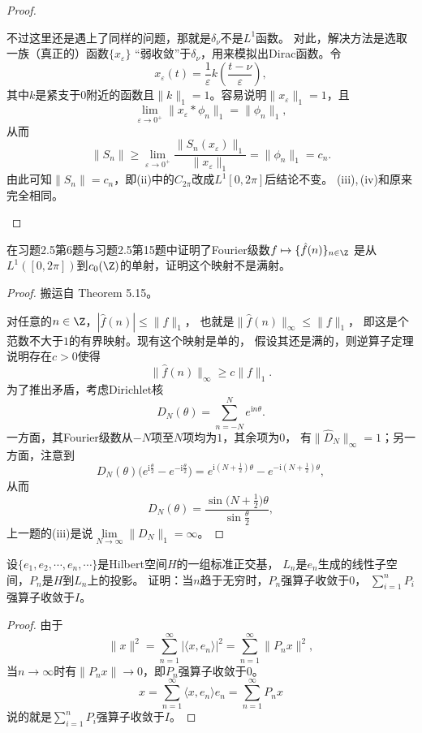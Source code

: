 \begin{proof}
\begin{enumerate}[label=(\roman*)]
    不过这里还是遇上了同样的问题，那就是$\delta_\nu$不是$L^1$函数。
    对此，解决方法是选取一族（真正的）函数$\{x_\varepsilon\}$
    ``弱收敛''于$\delta_\nu$，用来模拟出Dirac函数。令
    \[x_\varepsilon(t)=\dfrac{1}{\varepsilon}k\left(\frac{t-\nu}{\varepsilon}\right),\]
    其中$k$是紧支于$0$附近的函数且$\|k\|_1=1$。容易说明$\|x_\varepsilon\|_1=1$，且
    \[\lim_{\varepsilon\to0^+}\|x_\varepsilon*\phi_n\|_1=\|\phi_n\|_1,\]
    从而
    \[\|S_n\|\geqslant\lim_{\varepsilon\to0^+}\frac{\|S_n(x_\varepsilon)\|_1}{\|x_\varepsilon\|_1}
    =\|\phi_n\|_1=c_n.\]
    由此可知$\|S_n\|=c_n$，即(ii)中的$C_{2\pi}$改成$L^1[0,2\pi]$后结论不变。
    (iii),\,(iv)和原来完全相同。\qedhere
    \end{enumerate}
\end{proof}

\begin{21}
    在习题2.5第6题与习题2.5第15题中证明了Fourier级数$f\mapsto\{\hat{f}(n)\}_{n\in\Z}$
    是从$L^1([0,2\pi])$到$c_0(\Z)$的单射，证明这个映射不是满射。
\end{21}
\begin{proof}
    搬运自\cite{Ru} Theorem 5.15。
    
    对任意的$n\in\Z$，$|\hat{f}(n)|\leqslant\|f\|_1$，
    也就是$\|\hat{f}(n)\|_{\infty} \leqslant \|f\|_1$，
    即这是个范数不大于$1$的有界映射。现有这个映射是单的，
    假设其还是满的，则逆算子定理说明存在$c>0$使得
    \[\|\hat{f}(n)\|_{\infty} \geqslant c\|f\|_1.\]
    为了推出矛盾，考虑Dirichlet核\[D_N(\theta)=\sum_{n=-N}^{N}e^{\mathrm{i}n\theta}.\]
    一方面，其Fourier级数从$-N$项至$N$项均为$1$，其余项为$0$，
    有$\|\hat{D}_N\|_\infty=1$；另一方面，注意到
    \[D_N(\theta)\big(e^{\mathrm{i}\frac{\theta}{2}}-e^{-\mathrm{i}\frac{\theta}{2}}\big)
    =e^{\mathrm{i}(N+\frac{1}{2})\theta}-e^{-\mathrm{i}(N+\frac{1}{2})\theta},\]
    从而\[D_N(\theta)=\frac{\sin\big(N+\frac{1}{2}\big)\theta}{\sin\frac{\theta}{2}},\]
    上一题的(iii)是说$\lim\limits_{N\to\infty}\|D_N\|_1=\infty$。
\end{proof}

\begin{22}
    设$\{e_1,e_2,\cdots,e_n,\cdots\}$是Hilbert空间$H$的一组标准正交基，
    $L_n$是$e_n$生成的线性子空间，$P_n$是$H$到$L_n$上的投影。
    证明：当$n$趋于无穷时，$P_n$强算子收敛于$0$，
    $\displaystyle\sum_{i=1}^{n}P_i$强算子收敛于$I$。
\end{22}
\begin{proof}
    由于
    \[\|x\|^2=\sum_{n=1}^{\infty}|\langle x,e_n \rangle|^2
    =\sum_{n=1}^{\infty}\|P_nx\|^2,\]
    当$n\to\infty$时有$\|P_nx\|\to0$，即$P_n$强算子收敛于$0$。
    \[x=\sum_{n=1}^{\infty}\langle x,e_n\rangle e_n
    =\sum_{n=1}^{\infty}P_nx\]
    说的就是$\displaystyle\sum_{i=1}^{n}P_i$强算子收敛于$I$。
\end{proof}

